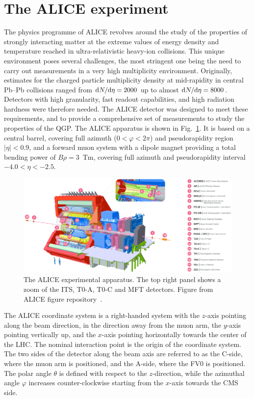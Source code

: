 \section{The ALICE experiment}
The physics programme of ALICE revolves around the study of the properties of strongly interacting matter at the extreme values of energy density and temperature reached in ultra-relativistic heavy-ion collisions. This unique environment poses several challenges, the most stringent one being the need to carry out measurements in a very high multiplicity environment. Originally, estimates for the charged particle multiplicity density at mid-rapidity in central Pb--Pb collisions ranged from $\mathrm{d} N/\mathrm{d}\eta = 2000$ up to almost $\mathrm{d} N/\mathrm{d}\eta = 8000$. Detectors with high granularity, fast readout capabilities, and high radiation hardness were therefore needed. The ALICE detector was designed to meet these requirements, and to provide a comprehensive set of measurements to study the properties of the QGP. The ALICE apparatus is shown in Fig.~\ref{fig:ALICE}. It is based on a central barrel, covering full azimuth ($0 < \varphi < 2\pi$) and pseudorapidity region $\lvert \eta\rvert <0.9$, and a forward muon system with a dipole magnet providing a total bending power of $B\rho = 3$~Tm, covering full azimuth and pseudorapidity interval $-4.0 < \eta < -2.5$.

\begin{figure}
    \centering
    \includegraphics[width=\textwidth]{Figures/Chapter 3/ALICE_Scheme.png}
    \caption{The ALICE experimental apparatus. The top right panel shows a zoom of the ITS, T0-A, T0-C and MFT detectors. Figure from ALICE figure repository~\cite{ALICE_figures}.}
    \label{fig:ALICE}
\end{figure}

The ALICE coordinate system is a right-handed system with the $z$-axis pointing along the beam direction, in the direction away from the muon arm, the $y$-axis pointing vertically up, and the $x$-axis pointing horizontally towards the center of the LHC. The nominal interaction point is the origin of the coordinate system. The two sides of the detector along the beam axis are referred to as the C-side, where the muon arm is positioned, and the A-side, where the FV0 is positioned. The polar angle $\theta$ is defined with respect to the $z$-direction, while the azimuthal angle $\varphi$ increases counter-clockwise
starting from the $x$-axis towards the CMS side.



